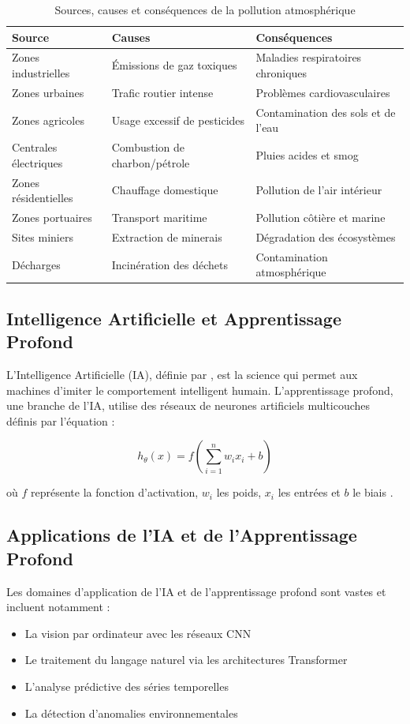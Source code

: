 \documentclass[12pt,a4paper]{report}
\begin{document}
\begin{table}[h]
    \centering
    \begin{tabular}{|p{5cm}|p{5cm}|p{5cm}|}
    \hline
    \textbf{Source} & \textbf{Causes} & \textbf{Conséquences} \\
    \hline
    Zones industrielles & Émissions de gaz toxiques & Maladies respiratoires chroniques \\
    \hline
    Zones urbaines & Trafic routier intense & Problèmes cardiovasculaires \\
    \hline
    Zones agricoles & Usage excessif de pesticides & Contamination des sols et de l'eau \\
    \hline
    Centrales électriques & Combustion de charbon/pétrole & Pluies acides et smog \\
    \hline
    Zones résidentielles & Chauffage domestique & Pollution de l'air intérieur \\
    \hline
    Zones portuaires & Transport maritime & Pollution côtière et marine \\
    \hline
    Sites miniers & Extraction de minerais & Dégradation des écosystèmes \\
    \hline
    Décharges & Incinération des déchets & Contamination atmosphérique \\
    \hline
    \end{tabular}
    \caption{Sources, causes et conséquences de la pollution atmosphérique}
    \label{tab:pollution}
    \end{table}
\subsection{Intelligence Artificielle et Apprentissage Profond}
L'Intelligence Artificielle (IA), définie par \cite{Russell2010}, est la science qui permet aux machines d'imiter le comportement intelligent humain. L'apprentissage profond, une branche de l'IA, utilise des réseaux de neurones artificiels multicouches définis par l'équation :

\begin{equation}
    h_{\theta}(x) = f(\sum_{i=1}^{n} w_i x_i + b)
\end{equation}

où $f$ représente la fonction d'activation, $w_i$ les poids, $x_i$ les entrées et $b$ le biais \cite{Goodfellow2016}.
\subsection{Applications de l'IA et de l'Apprentissage Profond}
Les domaines d'application de l'IA et de l'apprentissage profond sont vastes et incluent notamment :
\begin{itemize}
    \item La vision par ordinateur avec les réseaux CNN \cite{LeCun2015}
    \item Le traitement du langage naturel via les architectures Transformer
    \item L'analyse prédictive des séries temporelles
    \item La détection d'anomalies environnementales
\end{itemize}
\end{document}
